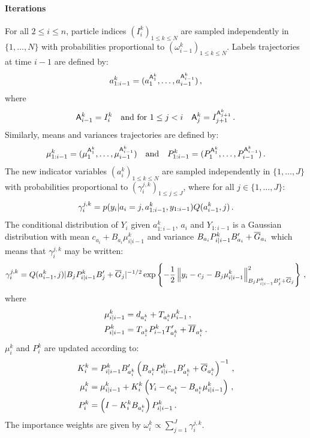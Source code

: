 \paragraph{Iterations}
For all $2\le i \le n$, particle indices $(I^k_i)_{1\le k \le N}$ are sampled independently in $\{1,\ldots,N\}$ with probabilities proportional to  $(\omega^k_{i-1})_{1\le k \le N}$.  Labels trajectories at time $i-1$ are defined by:
\[
a_{1:i-1}^k = (a^{\mathsf{A}^k_1}_1,\ldots,a^{\mathsf{A}^k_{i-1}}_{i-1})\eqsp,
\]
where
\[
\mathsf{A}^k_{i-1} = I^k_i \quad\mbox{and for } 1\le j<i\quad \mathsf{A}^k_{j} = I^{\mathsf{A}^k_{j+1}}_{j+1}\eqsp.
\]
Similarly, means and variances trajectories are defined by: 
\[
\mu_{1:i-1}^k = (\mu^{\mathsf{A}^k_1}_1,\ldots,\mu^{\mathsf{A}^k_{i-1}}_{i-1})\quad\mbox{and}\quad P_{1:i-1}^k = (P^{\mathsf{A}^k_1}_1,\ldots,P^{\mathsf{A}^k_{i-1}}_{i-1})\eqsp.
\]
The new indicator variables $(a_i^k)_{1\le k \le N}$ are sampled independently in  $\{1,\ldots, J\}$ with probabilities proportional to $(\gamma_i^{j,k})_{1\le j\le J}$, where for all $j \in \{1,\ldots, J\}$:
\[
\gamma_i^{j,k} = p(y_i | a_i = j, a_{1:i-1}^k, y_{1:i-1}) Q(a_{i-1}^k,j)\eqsp.
\]
The conditional distribution of $Y_i$ given $a^k_{1:i-1}$, $a_i$ and $Y_{1:i-1}$ is a Gaussian distribution with mean $c_{a_i}+B_{a_i}\mu^k_{i|i-1}$ and variance $B_{a_i}P^k_{i|i-1}B'_{a_i} + \barG_{a_i}$ which means that $\gamma_i^{j,k}$ may be written:
\[
\gamma_i^{j,k} =  Q(a_{i-1}^k,j)|B_jP^k_{i|i-1}B'_j + \barG_j|^{-1/2}\exp\left\{-\frac{1}{2}\normMat{B_jP^k_{i|i-1}B'_j + \barG_j}{y_i-c_{j}-B_j\mu^k_{i|i-1}}^2\right\} \eqsp,
\]
where 
\begin{align*}
\mu^{k}_{i|i-1} &= d_{a_{i}^k} + T_{a_{i}^k}\mu^k_{i-1}\eqsp,\\
P^k_{i|i-1} &= T_{a_{i}^k}P^k_{i-1}T'_{a_{i}^k} + \barH_{a_{i}^k}\eqsp.
\end{align*}
$\mu_i^k$ and $P_i^k$ are updated according to:
\begin{align*}
K^k_{i} &=P^k_{i|i-1}B'_{a_{i}^k}\left(B_{a_{i}^k}P^k_{i|i-1}B'_{a_{i}^k} + \barG_{a_{i}^k}\right)^{-1}\eqsp,\\
\mu^k_{i} &= \mu^{k}_{i|i-1} + K^k_i\left(Y_i - c_{a_{i}^k} - B_{a_{i}^k}\mu^{k}_{i|i-1}\right)\eqsp,\\
P^k_{i} &=\left(I-K^k_{i}B_{a_{i}^k}\right)P^k_{i|i-1}\eqsp.
\end{align*}
The importance weights are given by $\omega_i^k \propto \sum_{j=1}^J \gamma_i^{j,k}$.

